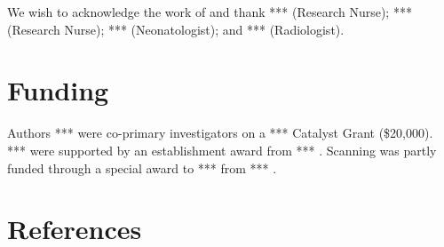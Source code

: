\documentclass[
  letterpaper,
  DIV=11,
  numbers=noendperiod]{scrartcl}
\begin{document}
We wish to acknowledge the work of and thank *** (Research Nurse); ***
(Research Nurse); *** (Neonatologist); and *** (Radiologist).

\section{Funding}\label{funding}

Authors *** were co-primary investigators on a *** Catalyst Grant
(\$20,000). *** were supported by an establishment award from *** .
Scanning was partly funded through a special award to *** from *** .

\newpage{}

\section{References}\label{references}
\end{document}
